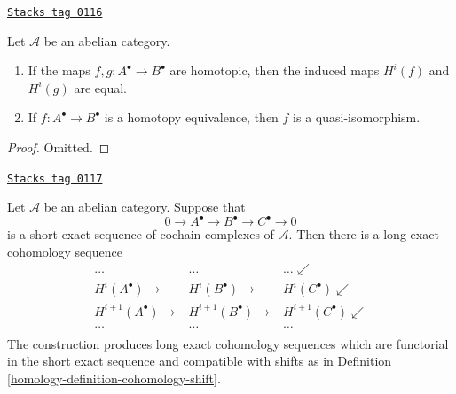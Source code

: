 \begin{lemma}
\label{homology-lemma-map-cohomology-homotopy-cochain}
\href{https://stacks.math.columbia.edu/tag/0116}{\texttt{Stacks tag 0116}}

Let $\mathcal{A}$ be an abelian category.
\begin{enumerate}
\item If the maps $f, g : A^\bullet \to B^\bullet$ are
homotopic, then the induced maps $H^i(f)$ and $H^i(g)$
are equal.
\item If $f : A^\bullet \to B^\bullet$ is a homotopy equivalence,
then $f$ is a quasi-isomorphism.
\end{enumerate}
\end{lemma}

\begin{proof}
Omitted.
\end{proof}

\begin{lemma}
\label{homology-lemma-long-exact-sequence-cochain}
\href{https://stacks.math.columbia.edu/tag/0117}{\texttt{Stacks tag 0117}}


Let $\mathcal{A}$ be an abelian category. Suppose that
$$
0 \to
A^\bullet \to
B^\bullet \to
C^\bullet \to
0
$$
is a short exact sequence of cochain complexes of $\mathcal{A}$.
Then there is a long exact cohomology sequence
$$
\begin{array}{ccc}\ldots & \ldots & \ldots \swarrow \\ H^i(A^\bullet) \longrightarrow & H^i(B^\bullet) \longrightarrow & H^i(C^\bullet) \swarrow \\ H^{i + 1}(A^\bullet) \longrightarrow & H^{i + 1}(B^\bullet) \longrightarrow & H^{i + 1}(C^\bullet) \swarrow \\ \ldots & \ldots & \ldots \\  &  & \end{array}
$$
The construction produces long exact cohomology sequences
which are functorial in the short exact
sequence and compatible with shifts as in
Definition \ref{homology-definition-cohomology-shift}.
\end{lemma}

